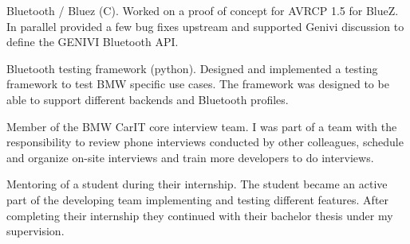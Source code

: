 \documentclass[alan.tex]{subfiles}
\begin{document}
\begin{my_desc}
        \begin{my_bullets}
          \item Bluetooth / Bluez (C).  Worked on a proof of concept for AVRCP 1.5 for BlueZ.
            In parallel provided a few bug fixes upstream and supported Genivi discussion to define the
            GENIVI Bluetooth API.
          \item Bluetooth testing framework (python). Designed and implemented a testing framework to
            test BMW specific use cases. The framework was designed to be able to support different backends and
            Bluetooth profiles.
        \end{my_bullets}
      \item[Member] of the BMW CarIT core interview team. I was part of a team with the responsibility to review phone interviews
        conducted by other colleagues, schedule and organize on-site interviews and train more developers to do interviews.
      \item[Mentoring] of a student during their internship. The student became an active part of the developing
        team implementing and testing different features. After completing their internship they continued with their bachelor thesis
        under my supervision.
    \end{my_desc}
\end{document}
